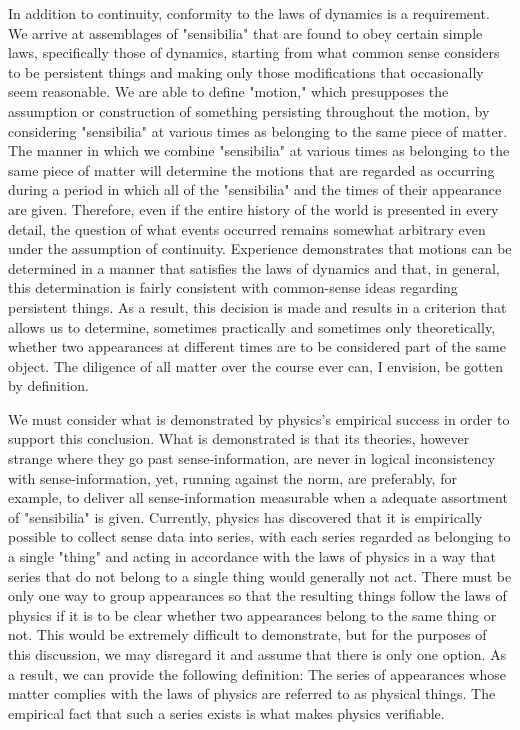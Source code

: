 \documentclass[a4paper,12pt]{book}[2004/02/16]
\theoremstyle{ilemma}
\theoremstyle{itheorem}
\theoremstyle{iother}
\theoremstyle{icorollary}
\theoremstyle{numcorollary}
\theoremstyle{idefinition}
\begin{document}
In addition to continuity, conformity to the laws of dynamics is a requirement. We arrive at assemblages of "sensibilia" that are found to obey certain simple laws, specifically those of dynamics, starting from what common sense considers to be persistent things and making only those modifications that occasionally seem reasonable. We are able to define "motion," which presupposes the assumption or construction of something persisting throughout the motion, by considering "sensibilia" at various times as belonging to the same piece of matter. The manner in which we combine "sensibilia" at various times as belonging to the same piece of matter will determine the motions that are regarded as occurring during a period in which all of the "sensibilia" and the times of their appearance are given. Therefore, even if the entire history of the world is presented in every detail, the question of what events occurred remains somewhat arbitrary even under the assumption of continuity. Experience demonstrates that motions can be determined in a manner that satisfies the laws of dynamics and that, in general, this determination is fairly consistent with common-sense ideas regarding persistent things. As a result, this decision is made and results in a criterion that allows us to determine, sometimes practically and sometimes only theoretically, whether two appearances at different times are to be considered part of the same object. The diligence of all matter
over the course ever can, I envision, be gotten by definition.

We must consider what is demonstrated by physics's empirical success in order to support this conclusion. What is demonstrated is that its
theories, however strange where they go past sense-information, are
never in logical inconsistency with sense-information, yet, running against the norm,
are preferably, for example, to deliver all sense-information measurable when a
adequate assortment of "sensibilia" is given. Currently, physics has discovered that it is empirically possible to collect sense data into series, with each series regarded as belonging to a single "thing" and acting in accordance with the laws of physics in a way that series that do not belong to a single thing would generally not act. There must be only one way to group appearances so that the resulting things follow the laws of physics if it is to be clear whether two appearances belong to the same thing or not. This would be extremely difficult to demonstrate, but for the purposes of this discussion, we may disregard it and assume that there is only one option. As a result, we can provide the following definition: The series of appearances whose matter complies with the laws of physics are referred to as physical things. The empirical fact that such a series exists is what makes physics verifiable.
\end{document}
